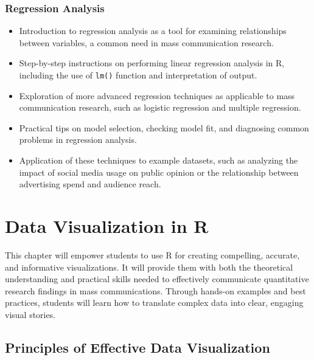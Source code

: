 \documentclass[
]{book}
\begin{document}
\hypertarget{regression-analysis}{%
\subsection*{Regression Analysis}\label{regression-analysis}}

\begin{itemize}
\item
  Introduction to regression analysis as a tool for examining relationships between variables, a common need in mass communication research.
\item
  Step-by-step instructions on performing linear regression analysis in R, including the use of \texttt{lm()} function and interpretation of output.
\item
  Exploration of more advanced regression techniques as applicable to mass communication research, such as logistic regression and multiple regression.
\item
  Practical tips on model selection, checking model fit, and diagnosing common problems in regression analysis.
\item
  Application of these techniques to example datasets, such as analyzing the impact of social media usage on public opinion or the relationship between advertising spend and audience reach.
\end{itemize}

\hypertarget{data-visualization-in-r}{%
\chapter*{Data Visualization in R}\label{data-visualization-in-r}}

This chapter will empower students to use R for creating compelling, accurate, and informative visualizations. It will provide them with both the theoretical understanding and practical skills needed to effectively communicate quantitative research findings in mass communications. Through hands-on examples and best practices, students will learn how to translate complex data into clear, engaging visual stories.

\hypertarget{principles-of-effective-data-visualization}{%
\section*{Principles of Effective Data Visualization}\label{principles-of-effective-data-visualization}}
\end{document}
